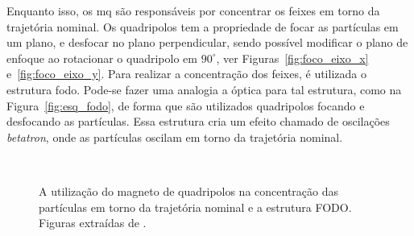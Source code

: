 Enquanto isso, os \gls{mq} são responsáveis por concentrar os
feixes em torno da trajetória nominal. Os quadripolos tem a propriedade de
focar as partículas em um plano, e desfocar no plano perpendicular, sendo
possível modificar o plano de enfoque ao rotacionar o quadripolo em $90^\circ$,
ver Figuras~\ref{fig:foco_eixo_x} e~\ref{fig:foco_eixo_y}. 
Para realizar a concentração dos feixes, é
utilizada o estrutura \gls{fodo}. Pode-se fazer uma analogia a óptica para tal
estrutura, como na Figura~\ref{fig:esq_fodo}, de forma que são 
utilizados quadripolos focando e desfocando as partículas. Essa estrutura cria um efeito
chamado de oscilações \emph{betatron}, onde as partículas oscilam em torno da
trajetória nominal.

\begin{figure}[ht!]
    \label{fig:quadripolos}
    \begin{center}
%
         \hspace{0.1\textwidth}
        \\ %
%
    \end{center}
    \caption[A utilização do magneto de quadripolos na concentração das partículas
em torno da trajetória nominal e estrutura FODO]{%
        A utilização do magneto de quadripolos na concentração das partículas em
      torno da trajetória nominal e a estrutura FODO. Figuras extraídas de 
      \cite{lecture_slides_1}.
     }%
\end{figure}


